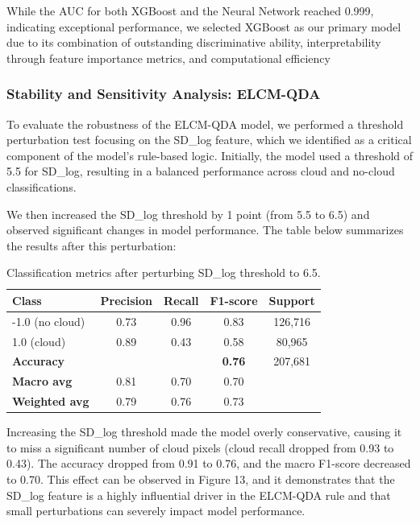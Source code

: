 \documentclass[10pt,letterpaper]{article}
\begin{document}
While the AUC for both XGBoost and the Neural Network reached 0.999, indicating exceptional performance, we selected XGBoost as our primary model due to its combination of outstanding discriminative ability, interpretability through feature importance metrics, and computational efficiency

\subsubsection{Stability and Sensitivity Analysis: ELCM-QDA}

To evaluate the robustness of the ELCM-QDA model, we performed a threshold perturbation test focusing on the SD\_log feature, which we identified as a critical component of the model's rule-based logic. Initially, the model used a threshold of 5.5 for SD\_log, resulting in a balanced performance across cloud and no-cloud classifications.

We then increased the SD\_log threshold by 1 point (from 5.5 to 6.5) and observed significant changes in model performance. The table below summarizes the results after this perturbation:

\begin{table}[h]
\centering
\begin{tabular}{lcccc}
\hline
\textbf{Class} & \textbf{Precision} & \textbf{Recall} & \textbf{F1-score} & \textbf{Support} \\
\hline
-1.0 (no cloud) & 0.73 & 0.96 & 0.83 & 126,716 \\
1.0 (cloud)     & 0.89 & 0.43 & 0.58 & 80,965 \\
\hline
\textbf{Accuracy} & & & \textbf{0.76} & 207,681 \\
\textbf{Macro avg} & 0.81 & 0.70 & 0.70 &  \\
\textbf{Weighted avg} & 0.79 & 0.76 & 0.73 &  \\
\hline
\end{tabular}
\caption{Classification metrics after perturbing SD\_log threshold to 6.5.}
\end{table}

Increasing the SD\_log threshold made the model overly conservative, causing it to miss a significant number of cloud pixels (cloud recall dropped from 0.93 to 0.43). The accuracy dropped from 0.91 to 0.76, and the macro F1-score decreased to 0.70. This effect can be observed in Figure 13, and it demonstrates that the SD\_log feature is a highly influential driver in the ELCM-QDA rule and that small perturbations can severely impact model performance.
\end{document}
